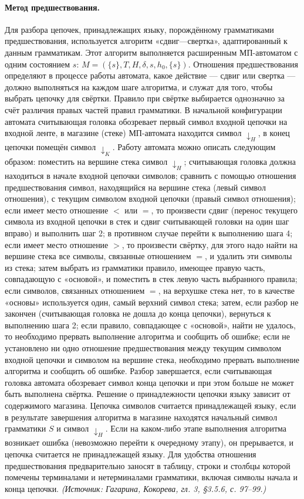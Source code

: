\documentclass[a4paper,12pt]{article}
\begin{document}
\paragraph{Метод предшествования.}
Для разбора цепочек, принадлежащих языку, порождённому грамматиками предшествования, используется алгоритм «сдвиг—свертка», адаптированный к данным грамматикам. Этот алгоритм выполняется расширенным МП-автоматом с одним состоянием \(s\): \(M=(\{s\},T,H,\delta,s,h_0,\{s\})\). Отношения предшествования определяют в процессе работы автомата, какое действие — сдвиг или свертка — должно выполняться на каждом шаге алгоритма, и служат для того, чтобы выбрать цепочку для свёртки. Правило при свёртке выбирается однозначно за счёт различия правых частей правил грамматики. В начальной конфигурации автомата считывающая головка обозревает первый символ входной цепочки на входной ленте, в магазине (стеке) МП-автомата находится символ \(\downarrow_H\), в конец цепочки помещён символ \(\downarrow_K\). Работу автомата можно описать следующим образом: поместить на вершине стека символ \(\downarrow_H\); считывающая головка должна находиться в начале входной цепочки символов; сравнить с помощью отношения предшествования символ, находящийся на вершине стека (левый символ отношения), с текущим символом входной цепочки (правый символ отношения); если имеет место отношение \(<\) или \(=\), то произвести сдвиг (перенос текущего символа из входной цепочки в стек и сдвиг считывающей головки на один шаг вправо) и выполнить шаг 2; в противном случае перейти к выполнению шага 4; если имеет место отношение \(>\), то произвести свёртку, для этого надо найти на вершине стека все символы, связанные отношением \(=\), и удалить эти символы из стека; затем выбрать из грамматики правило, имеющее правую часть, совпадающую с «основой», и поместить в стек левую часть выбранного правила; если символов, связанных отношением \(=\), на верхушке стека нет, то в качестве «основы» используется один, самый верхний символ стека; затем, если разбор не закончен (считывающая головка не дошла до конца цепочки), вернуться к выполнению шага 2; если правило, совпадающее с «основой», найти не удалось, то необходимо прервать выполнение алгоритма и сообщить об ошибке; если не установлено ни одно отношение предшествования между текущим символом входной цепочки и символом на вершине стека, необходимо прервать выполнение алгоритма и сообщить об ошибке. Разбор завершается, если считывающая головка автомата обозревает символ конца цепочки и при этом больше не может быть выполнена свёртка. Решение о принадлежности цепочки языку зависит от содержимого магазина. Цепочка символов считается принадлежащей языку, если в результате завершения алгоритма в магазине находятся начальный символ грамматики \(S\) и символ \(\downarrow_H\). Если на каком-либо этапе выполнения алгоритма возникает ошибка (невозможно перейти к очередному этапу), он прерывается, и цепочка считается не принадлежащей языку. Для удобства отношения предшествования предварительно заносят в таблицу, строки и столбцы которой помечены терминалами и нетерминалами грамматики, включая символы начала и конца цепочки.
\textit{(Источник: Гагарина, Кокорева, гл. 3, §3.5.6, с. 97--99.)}
\end{document}
